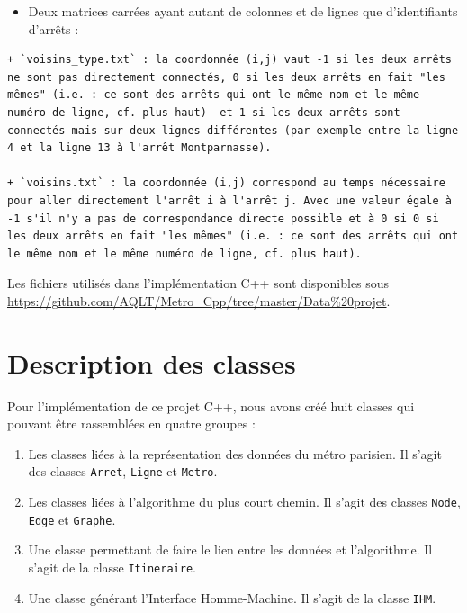 \documentclass[,french]{article}
\providecommand{\tightlist}{%
  \setlength{\itemsep}{0pt}\setlength{\parskip}{0pt}}
\begin{document}
\begin{itemize}
\tightlist
\item
  Deux matrices carrées ayant autant de colonnes et de lignes que
  d'identifiants d'arrêts :
\end{itemize}

\begin{verbatim}
+ `voisins_type.txt` : la coordonnée (i,j) vaut -1 si les deux arrêts ne sont pas directement connectés, 0 si les deux arrêts en fait "les mêmes" (i.e. : ce sont des arrêts qui ont le même nom et le même numéro de ligne, cf. plus haut)  et 1 si les deux arrêts sont connectés mais sur deux lignes différentes (par exemple entre la ligne 4 et la ligne 13 à l'arrêt Montparnasse).

+ `voisins.txt` : la coordonnée (i,j) correspond au temps nécessaire pour aller directement l'arrêt i à l'arrêt j. Avec une valeur égale à -1 s'il n'y a pas de correspondance directe possible et à 0 si 0 si les deux arrêts en fait "les mêmes" (i.e. : ce sont des arrêts qui ont le même nom et le même numéro de ligne, cf. plus haut).
\end{verbatim}

Les fichiers utilisés dans l'implémentation C++ sont disponibles sous
\url{https://github.com/AQLT/Metro_Cpp/tree/master/Data\%20projet}.

\hypertarget{sec:desc_classes}{%
\section{Description des classes}\label{sec:desc_classes}}

Pour l'implémentation de ce projet C++, nous avons créé huit classes qui
pouvant être rassemblées en quatre groupes :

\begin{enumerate}
\def\labelenumi{\arabic{enumi}.}
\item
  Les classes liées à la représentation des données du métro parisien.
  Il s'agit des classes \texttt{Arret}, \texttt{Ligne} et
  \texttt{Metro}.
\item
  Les classes liées à l'algorithme du plus court chemin. Il s'agit des
  classes \texttt{Node}, \texttt{Edge} et \texttt{Graphe}.
\item
  Une classe permettant de faire le lien entre les données et
  l'algorithme. Il s'agit de la classe \texttt{Itineraire}.
\item
  Une classe générant l'Interface Homme-Machine. Il s'agit de la classe
  \texttt{IHM}.
\end{enumerate}
\end{document}
